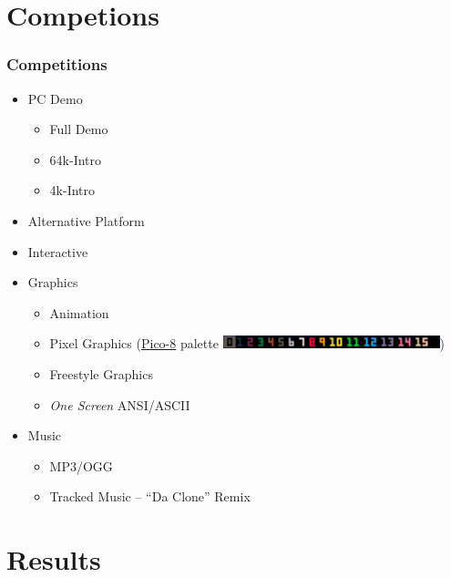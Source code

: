 \documentclass{beamer}
\begin{document}
\section{Competions}

\begin{frame}
  \frametitle{Competitions}
  \begin{itemize}
  \item PC Demo
    \begin{itemize}
    \item Full Demo
    \item 64k-Intro
    \item 4k-Intro
    \end{itemize}
  \item Alternative Platform
  \item Interactive
  \item Graphics
    \begin{itemize}
    \item Animation
    \item Pixel Graphics (\href{https://www.lexaloffle.com/pico-8.php}{Pico-8} palette \href{https://www.romanzolotarev.com/pico-8-color-palette/}{\includegraphics[width=17em]{palette}})
    \item Freestyle Graphics
    \item \emph{One Screen} ANSI/ASCII
    \end{itemize}
  \item Music
    \begin{itemize}
    \item MP3/OGG
    \item Tracked Music -- ``Da Clone'' Remix
    \end{itemize}
  \end{itemize}
\end{frame}


\section{Results}
\end{document}
